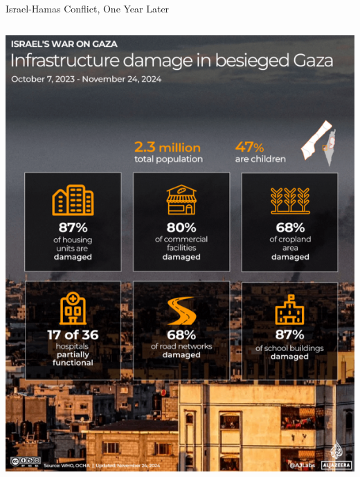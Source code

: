 \documentclass[
  ignorenonframetext,
]{beamer}
\begin{document}
\begin{frame}{Israel-Hamas Conflict, One Year Later}
\begin{columns}[T]
\begin{column}{0.5\textwidth}
\includegraphics{images/aljazeera_gaza_snapshop.png}
\end{column}
\end{columns}
\end{frame}
\end{document}
